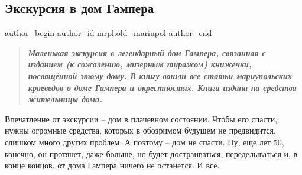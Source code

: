  
 
 
 
 
 
\subsection{Экскурсия в дом Гампера}
\label{sec:10_12_2018.stz.mrpl.old_mariupol.1.ekskursia_v_dom_gampera}
 
\ifcmt
 author_begin
   author_id mrpl.old_mariupol
 author_end
\fi

\begin{quote}
\em\bfseries
Маленькая экскурсия в легендарный дом Гампера, связанная с изданием (к
сожалению, мизерным тиражом) книжечки, посвящённой этому дому. В книгу вошли
все статьи мариупольских краеведов о доме Гампера и окрестностях. Книга издана
на средства жительницы дома.
\end{quote}


Впечатление от экскурсии – дом в плачевном состоянии. Чтобы его спасти, нужны
огромные средства, которых в обозримом будущем не предвидится, слишком много
других проблем. А поэтому – дом не спасти. Ну, еще лет 50, конечно, он
протянет, даже больше, но будет достраиваться, переделываться и, в конце
концов, от дома Гампера ничего не останется. И всё.
